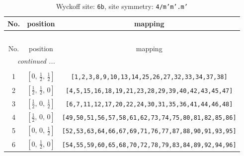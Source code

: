 \documentclass[fleqn,8pt]{jsarticle}
\begin{document}
\begin{longtable}{ccc}
\caption{Wyckoff site: {\tt 6b}, site symmetry: {\tt 4/m'm'.m'}}
 \\
 \hline \hline
No. & position & mapping \\ \hline \endfirsthead

\multicolumn{2}{l}{\tablename\ \thetable{}} \\
 \hline \hline
No. & position & mapping \\ \hline \endhead

 \hline \hline
\multicolumn{2}{r}{\footnotesize\it continued ...} \\ \endfoot

 \hline \hline
\multicolumn{2}{r}{} \\ \endlastfoot

1 & $\left[ 0,\, \frac{1}{2},\, \frac{1}{2} \right]$ & {\tt [1,2,3,8,9,10,13,14,25,26,27,32,33,34,37,38]} \\ \hline
2 & $\left[ \frac{1}{2},\, \frac{1}{2},\, 0 \right]$ & {\tt [4,5,15,16,18,19,21,23,28,29,39,40,42,43,45,47]} \\ \hline
3 & $\left[ \frac{1}{2},\, 0,\, \frac{1}{2} \right]$ & {\tt [6,7,11,12,17,20,22,24,30,31,35,36,41,44,46,48]} \\ \hline
4 & $\left[ \frac{1}{2},\, 0,\, 0 \right]$ & {\tt [49,50,51,56,57,58,61,62,73,74,75,80,81,82,85,86]} \\ \hline
5 & $\left[ 0,\, 0,\, \frac{1}{2} \right]$ & {\tt [52,53,63,64,66,67,69,71,76,77,87,88,90,91,93,95]} \\ \hline
6 & $\left[ 0,\, \frac{1}{2},\, 0 \right]$ & {\tt [54,55,59,60,65,68,70,72,78,79,83,84,89,92,94,96]} \\
\end{longtable}
\renewcommand{\arraystretch}{1.2}
\end{document}
